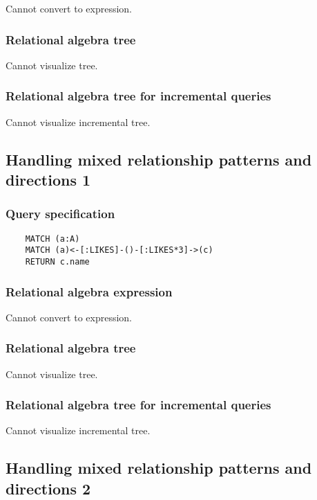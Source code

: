 	Cannot convert to expression.

	\subsubsection*{Relational algebra tree}

	Cannot visualize tree.

	\subsubsection*{Relational algebra tree for incremental queries}

	Cannot visualize incremental tree.
	\subsection{Handling mixed relationship patterns and directions 1}

	\subsubsection*{Query specification}

	\begin{lstlisting}
	MATCH (a:A)
	MATCH (a)<-[:LIKES]-()-[:LIKES*3]->(c)
	RETURN c.name
	\end{lstlisting}


	\subsubsection*{Relational algebra expression}

	Cannot convert to expression.

	\subsubsection*{Relational algebra tree}

	Cannot visualize tree.

	\subsubsection*{Relational algebra tree for incremental queries}

	Cannot visualize incremental tree.
	\subsection{Handling mixed relationship patterns and directions 2}

